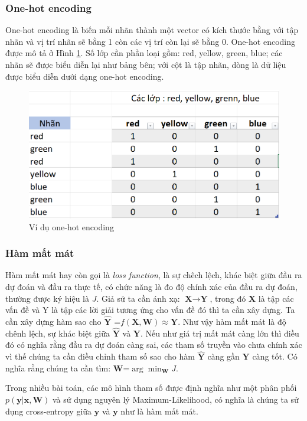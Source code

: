 \subsubsection{One-hot encoding}
\hspace{5mm} One-hot encoding là biến mỗi nhãn thành một vector có kích thước bằng với tập nhãn và vị trí nhãn sẽ bằng 1 còn các vị trí còn lại sẽ bằng 0. One-hot encoding được mô tả ở Hình \ref{fig:onehot}. Số lớp cần phần loại gồm: red, yellow, green, blue; các nhãn sẽ được biểu diễn lại như bảng bên; với cột là tập nhãn, dòng là dữ liệu được biểu diễn dưới dạng one-hot encoding.
\begin{figure}[H]
\begin{center}
\includegraphics[scale=0.75]{chap3/image/onehot.png}

\caption{ Ví dụ one-hot encoding}
\label{fig:onehot}
\end{center}
\end{figure}
\subsubsection{Hàm mất mát}
\hspace{5mm} Hàm mất mát hay còn gọi là \textit{loss function}, là sự chêch lệch, khác biệt giữa đầu ra dự đoán và đầu ra thực tế, có chức năng là đo độ chính xác của đầu ra dự đoán, thường được ký hiệu là $J$. Giả sử ta cần ánh xạ: $\textbf{X}\to \textbf{Y}$,  trong đó \textbf{X} là tập các vấn đề và Y là tập các lời giải tương ứng cho vấn đề đó thì ta cần xây dựng. Ta cần xây dựng hàm sao cho $\widehat{\textbf{Y}}$ =$ f(\textbf{X},\textbf{W}) \approx \textbf{Y}$. Như vậy hàm mất mát là độ chênh lệch, sự khác biệt giữa \textbf{$\widehat{\textbf{Y}}$} và $\textbf{Y}$. Nếu như giá trị mất mát càng lớn thì điều đó có nghĩa rằng đầu ra dự đoán càng sai, các tham số truyền vào chưa chính xác vì thế chúng ta cần điều chỉnh tham số sao cho hàm \textbf{$\widehat{\textbf{Y}}$} càng gần $\textbf{Y}$ càng tốt. Có nghĩa rằng chúng ta cần tìm: $\textbf{W}$=$\arg\min_{\textbf{W}} J$.\par
Trong nhiều bài toán, các mô hình tham số được định nghĩa như một phân phối $p(\textbf{y}|\textbf{x},\textbf{W})$ và sử dụng nguyên lý Maximum-Likelihood, có nghĩa là chúng ta sử dụng cross-entropy giữa $\widehat{\textbf{y}}$ và $\textbf{y}$ như là hàm mất mát. 

